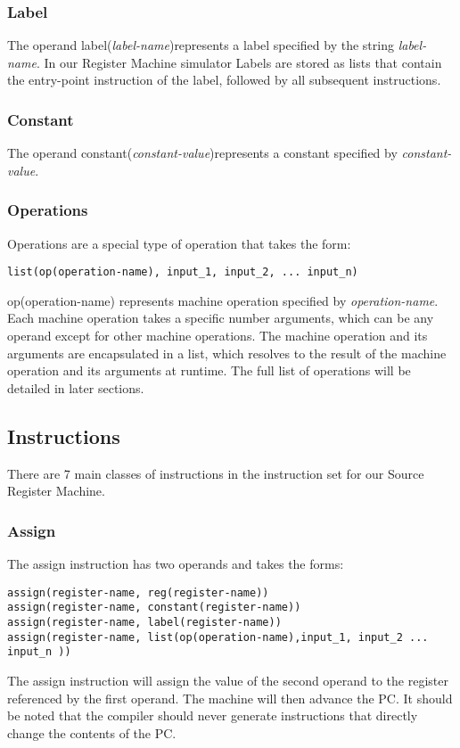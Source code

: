 \subsubsection{Label}
The operand label(\textit{label-name})represents a label specified by the string \textit{label-name}. In our Register Machine simulator Labels are stored as lists that contain the entry-point instruction of the label, followed by all subsequent instructions.

\subsubsection{Constant}
The operand constant(\textit{constant-value})represents a constant specified by \textit{constant-value}.

\subsubsection{Operations}
Operations are a special type of operation that takes the form:
\begin{lstlisting}
list(op(operation-name), input_1, input_2, ... input_n)
\end{lstlisting}
op(operation-name) represents machine operation specified by \textit{operation-name}. Each machine operation takes a specific number arguments, which can be any operand except for other machine operations. The machine operation and its arguments are encapsulated in a list, which resolves to the result of the machine operation and its arguments at runtime. The full list of operations will be detailed in later sections.
 


\subsection{Instructions}
There are 7 main classes of instructions in the instruction set for our Source Register Machine.

\subsubsection{Assign}
The assign instruction has two operands and takes the forms:
\begin{lstlisting}
assign(register-name, reg(register-name))
assign(register-name, constant(register-name))
assign(register-name, label(register-name))
assign(register-name, list(op(operation-name),input_1, input_2 ... input_n ))
\end{lstlisting}
The assign instruction will assign the value of the second operand to the register referenced by the first operand. The machine will then advance the PC. It should be noted that the compiler should never generate instructions that directly change the contents of the PC.

